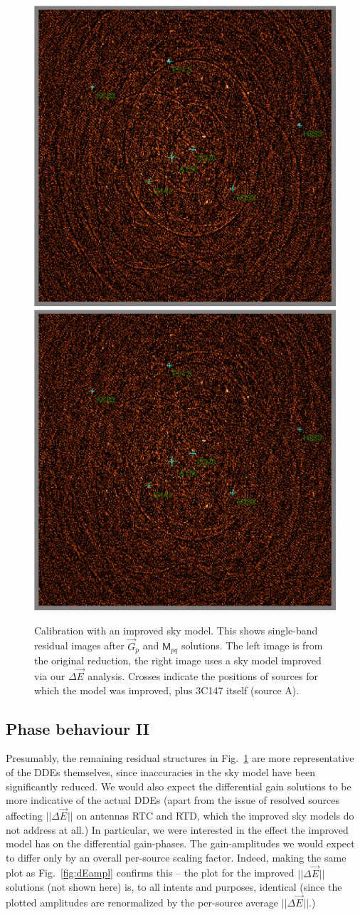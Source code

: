 \documentclass[]{aa}
\newcommand{\jones}[2]{\vec {#1}_{#2}}
\newcommand{\coh}[2]{\mathsf{{#1}}_{{#2}}}
\begin{document}
\begin{figure}
\begin{centering}
\includegraphics[width=.5\columnwidth]{spw2_oldmodel}%
\includegraphics[width=.5\columnwidth]{spw2_newmodel}\par
\end{centering}
\caption{\label{fig:residuals-newmodel}Calibration with an improved sky model. This shows single-band residual images after $\jones{G}{p}$ and $\coh{M}{pq}$ solutions. The left image is from the original reduction, the right image uses a sky model improved via our $\Delta\jones{E}{}$ analysis. Crosses indicate the positions of sources for which the model was improved, plus 3C147 itself (source A).}
\end{figure}

\subsection{Phase behaviour II\label{sec:de-analysis-phase2}}

Presumably, the remaining residual structures in Fig.~\ref{fig:residuals-newmodel} are more representative of the DDEs themselves, since inaccuracies in the sky model have been significantly reduced. We would also expect the differential gain solutions to be more indicative of the actual DDEs (apart from the issue of resolved sources affecting $||\Delta\jones{E}{}||$ on antennas RTC and RTD, which the improved sky models do not address at all.) In particular, we were interested in the effect the improved model has on the differential gain-phases. The gain-amplitudes we would expect to differ only by an overall per-source scaling factor. Indeed, making the same plot as Fig.~\ref{fig:dEampl} confirms this -- the plot for the improved $||\Delta\jones{E}{}||$ solutions (not shown here) is, to all intents and purposes, identical (since the plotted amplitudes are renormalized by the per-source average $||\Delta\jones{E}{}||$.)
\end{document}
